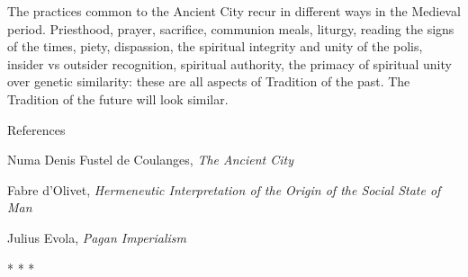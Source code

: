 The practices common to the Ancient City recur in different ways in the Medieval period. Priesthood, prayer, sacrifice, communion meals, liturgy, reading the signs of the times, piety, dispassion, the spiritual integrity and unity of the polis, insider vs outsider recognition, spiritual authority, the primacy of spiritual unity over genetic similarity: these are all aspects of Tradition of the past. The Tradition of the future will look similar.


\hfill

References

Numa Denis Fustel de Coulanges, \emph{The Ancient City}

Fabre d'Olivet, \emph{Hermeneutic Interpretation of the Origin of the Social State of Man}

Julius Evola, \emph{Pagan Imperialism}




\begin{center}* * *\end{center}

